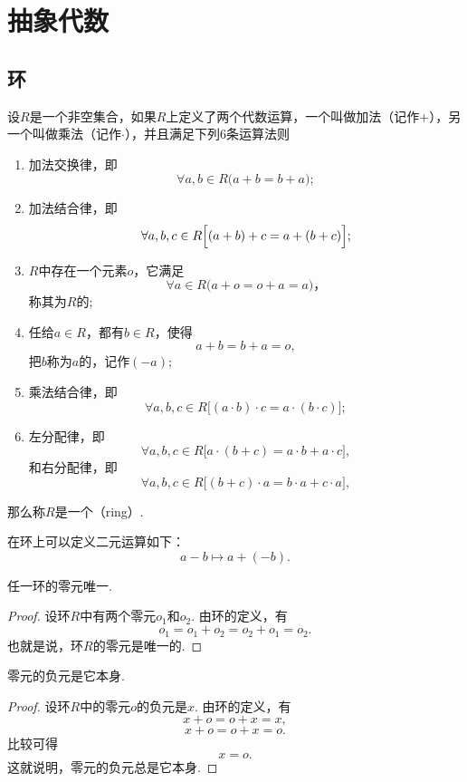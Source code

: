 \section{抽象代数}
\subsection{环}
\begin{definition}
设\(R\)是一个非空集合，如果\(R\)上定义了两个代数运算，一个叫做加法（记作\(+\)），另一个叫做乘法（记作\(\cdot\)），并且满足下列6条运算法则\begin{enumerate}
\item 加法交换律，即\[
\forall a,b \in R \bigl(a+b = b+a\bigr);
\]
\item 加法结合律，即\[
\forall a,b,c \in R \Bigl[(a+b)+c = a+(b+c)\Bigr];
\]
\item \(R\)中存在一个元素\(o\)，它满足\[
\forall a \in R \bigl( a+o = o+a = a \bigr)，%
\]称其为\(R\)的;
\item 任给\(a \in R\)，都有\(b \in R\)，使得\[
a+b = b+a = o,
\]把\(b\)称为\(a\)的，记作\((-a)\);
\item 乘法结合律，即\[
\forall a,b,c \in R \bigl[ (a \cdot b) \cdot c = a \cdot (b \cdot c) \bigr];
\]
\item 左分配律，即\[
\forall a,b,c \in R \bigl[ a \cdot (b+c) = a \cdot b + a \cdot c \bigr],
\]和右分配律，即\[
\forall a,b,c \in R \bigl[ (b+c) \cdot a = b \cdot a + c \cdot a \bigr],
\]
\end{enumerate}那么称\(R\)是一个（ring）.

在环上可以定义二元运算如下：\[
a - b \mapsto a + (-b).
\]
\end{definition}

\begin{property}
任一环的零元唯一.
\begin{proof}
设环\(R\)中有两个零元\(o_1\)和\(o_2\).
由环的定义，有\[
o_1 = o_1 + o_2 = o_2 + o_1 = o_2.
\]也就是说，环\(R\)的零元是唯一的.
\end{proof}
\end{property}

\begin{property}
零元的负元是它本身.
\begin{proof}
设环\(R\)中的零元\(o\)的负元是\(x\).
由环的定义，有\[
x + o = o + x = x,
\]\[
x + o = o + x = o.
\]比较可得\[
x = o.
\]这就说明，零元的负元总是它本身.
\end{proof}
\end{property}

